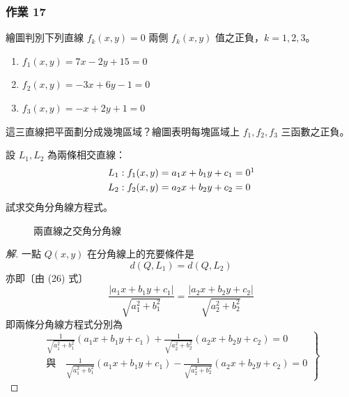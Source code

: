 \subsubsection*{作業 17}
繪圖判別下列直線 $f_k(x, y) = 0$ 兩側 $f_k(x, y)$ 值之正負，$k = 1, 2, 3$。
\begin{enumerate}[label=(\roman*), leftmargin=2em]
  \item $f_1(x, y) = 7x - 2y + 15 = 0$
  \item $f_2(x, y) = -3x + 6y - 1 = 0$
  \item $f_3(x, y) = -x + 2y + 1 = 0$
\end{enumerate}
這三直線把平面劃分成幾塊區域？繪圖表明每塊區域上 $f_1, f_2, f_3$ 三函數之正負。

\begin{example}[論例 5]\label{note:b3s-ch4-p177-l1-l2-subscripts}
設 $L_1, L_2$ 為兩條相交直線：
\begin{align*}
L_1 &: f_1(x, y) = a_1 x + b_1 y + c_1 = 0\footnotemark \\
L_2 &: f_2(x, y) = a_2 x + b_2 y + c_2 = 0
\end{align*}
試求交角分角線方程式。
\end{example}

\begin{figure}[H]
\centering
{}
\caption{兩直線之交角分角線}
\label{fig:4-34}
\end{figure}

\begin{proof}[解]
一點 $Q(x, y)$ 在分角線上的充要條件是
\[ d(Q, L_1) = d(Q, L_2) \]
亦即〔由 (26) 式〕
\[ \frac{|a_1 x + b_1 y + c_1|}{\sqrt{a_1^2 + b_1^2}} = \frac{|a_2 x + b_2 y + c_2|}{\sqrt{a_2^2 + b_2^2}} \]
即兩條分角線方程式分別為
\begin{equation}
\left.
\begin{aligned}
\frac{1}{\sqrt{a_1^2 + b_1^2}}(a_1 x + b_1 y + c_1) + \frac{1}{\sqrt{a_2^2 + b_2^2}}(a_2 x + b_2 y + c_2) = 0 \\
\text{與}\quad \frac{1}{\sqrt{a_1^2 + b_1^2}}(a_1 x + b_1 y + c_1) - \frac{1}{\sqrt{a_2^2 + b_2^2}}(a_2 x + b_2 y + c_2) = 0
\end{aligned}
\right\}
\label{eq:b3s-4-27}
\end{equation}
\end{proof}

